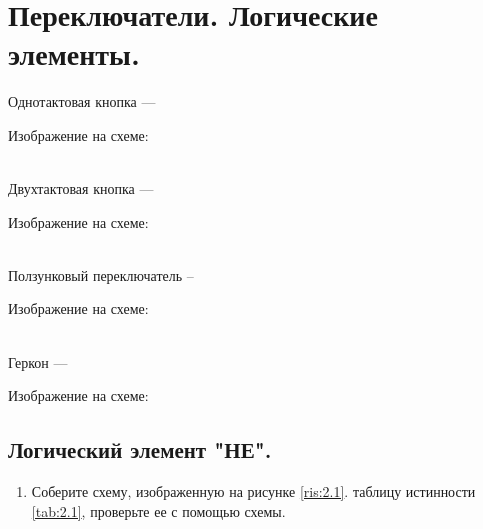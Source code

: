 \section{Переключатели. Логические элементы.}

Однотактовая кнопка --- \hrulefill

\hrulefill

Изображение на схеме:

\\
Двухтактовая кнопка --- \hrulefill

\hrulefill

Изображение на схеме:

\\
Ползунковый переключатель -- \hrulefill

\hrulefill

Изображение на схеме:

\\
Геркон --- \hrulefill

\hrulefill

Изображение на схеме:


\subsection{Логический элемент "НЕ".}

\begin{enumerate}
    \item Соберите схему, изображенную на рисунке \ref{ris:2.1}.
     таблицу истинности \ref{tab:2.1}, проверьте ее с помощью схемы.
\end{enumerate}

